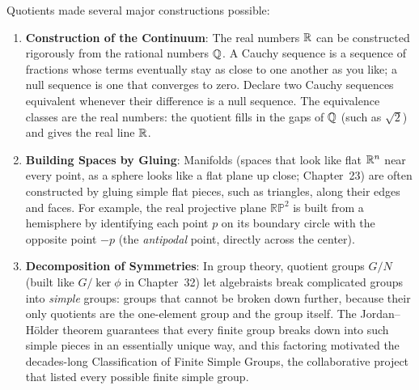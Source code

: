 Quotients made several major constructions possible:
\begin{enumerate}
  \item \textbf{Construction of the Continuum}: The real numbers $\mathbb{R}$ can be constructed rigorously from the rational numbers $\mathbb{Q}$. A Cauchy sequence is a sequence of fractions whose terms eventually stay as close to one another as you like; a null sequence is one that converges to zero. Declare two Cauchy sequences equivalent whenever their difference is a null sequence. The equivalence classes are the real numbers: the quotient fills in the gaps of $\mathbb{Q}$ (such as $\sqrt{2}$) and gives the real line $\mathbb{R}$.
  \item \textbf{Building Spaces by Gluing}: Manifolds (spaces that look like flat $\mathbb{R}^n$ near every point, as a sphere looks like a flat plane up close; Chapter~23) are often constructed by gluing simple flat pieces, such as triangles, along their edges and faces. For example, the real projective plane $\mathbb{RP}^2$ is built from a hemisphere by identifying each point $p$ on its boundary circle with the opposite point $-p$ (the \emph{antipodal} point, directly across the center).
  \item \textbf{Decomposition of Symmetries}: In group theory, quotient groups $G/N$ (built like $G/\ker\phi$ in Chapter~32) let algebraists break complicated groups into \emph{simple} groups: groups that cannot be broken down further, because their only quotients are the one-element group and the group itself. The Jordan--H\"older theorem guarantees that every finite group breaks down into such simple pieces in an essentially unique way, and this factoring motivated the decades-long Classification of Finite Simple Groups, the collaborative project that listed every possible finite simple group.
\end{enumerate}

